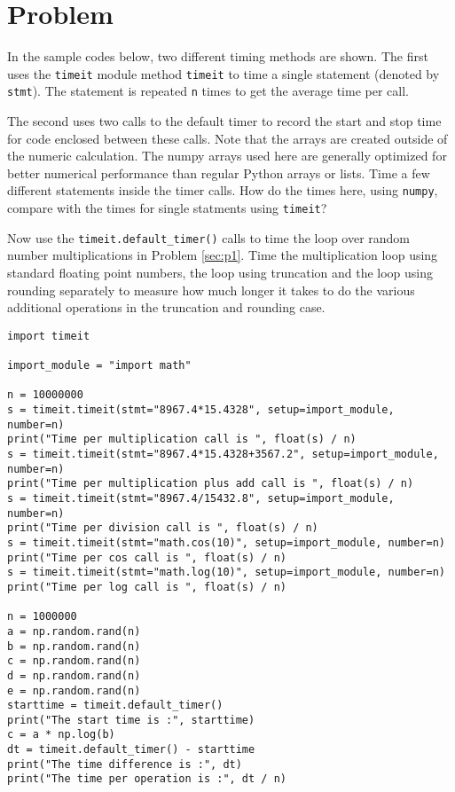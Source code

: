 \section{Problem \thesection}

In the sample codes below, two different timing methods are shown. The first uses the
\texttt{timeit} module method \texttt{timeit} to time a single statement (denoted by
\texttt{stmt}). The statement is repeated \texttt{n} times to get the average time per call.

The second uses two calls to the default timer to record the start and stop time for code
enclosed between these calls. Note that the arrays are created outside of the numeric
calculation. The numpy arrays used here are generally optimized for better numerical
performance than regular Python arrays or lists. Time a few different statements inside the
timer calls. How do the times here, using \texttt{numpy}, compare with the times for single
statments using \texttt{timeit}?

Now use the \texttt{timeit.default\_timer()} calls to time the loop over random number
multiplications in Problem \ref{sec:p1}. Time the multiplication loop using standard
floating point numbers, the loop using truncation and the loop using rounding separately to
measure how much longer it takes to do the various additional operations in the truncation
and rounding case.

\begin{verbatim}
import timeit

import_module = "import math"

n = 10000000
s = timeit.timeit(stmt="8967.4*15.4328", setup=import_module, number=n)
print("Time per multiplication call is ", float(s) / n)
s = timeit.timeit(stmt="8967.4*15.4328+3567.2", setup=import_module, number=n)
print("Time per multiplication plus add call is ", float(s) / n)
s = timeit.timeit(stmt="8967.4/15432.8", setup=import_module, number=n)
print("Time per division call is ", float(s) / n)
s = timeit.timeit(stmt="math.cos(10)", setup=import_module, number=n)
print("Time per cos call is ", float(s) / n)
s = timeit.timeit(stmt="math.log(10)", setup=import_module, number=n)
print("Time per log call is ", float(s) / n)

n = 1000000
a = np.random.rand(n)
b = np.random.rand(n)
c = np.random.rand(n)
d = np.random.rand(n)
e = np.random.rand(n)
starttime = timeit.default_timer()
print("The start time is :", starttime)
c = a * np.log(b)
dt = timeit.default_timer() - starttime
print("The time difference is :", dt)
print("The time per operation is :", dt / n)
\end{verbatim}
